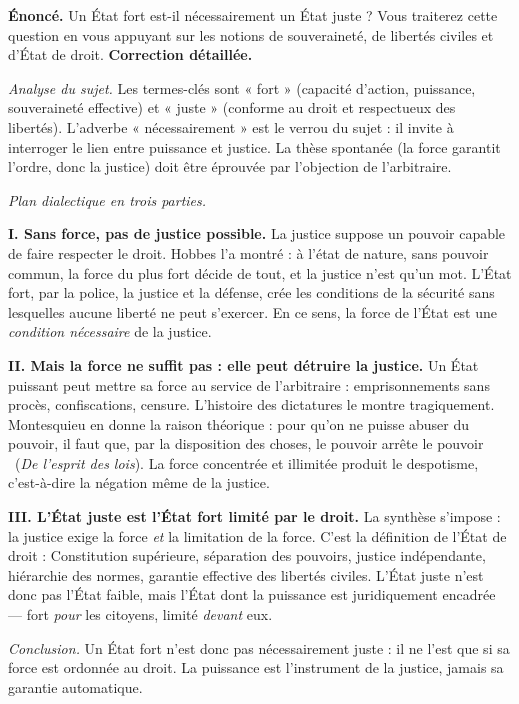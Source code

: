 \documentclass[11pt]{article}
\begin{document}
\begin{exoresolu}
\textbf{Énoncé.} Un État fort est-il nécessairement un État juste ? Vous traiterez cette question en vous appuyant sur les notions de souveraineté, de libertés civiles et d'État de droit.
\tcblower
\textbf{Correction détaillée.}

\emph{Analyse du sujet.} Les termes-clés sont « fort » (capacité d'action, puissance, souveraineté effective) et « juste » (conforme au droit et respectueux des libertés). L'adverbe « nécessairement » est le verrou du sujet : il invite à interroger le lien entre puissance et justice. La thèse spontanée (la force garantit l'ordre, donc la justice) doit être éprouvée par l'objection de l'arbitraire.

\emph{Plan dialectique en trois parties.}

\textbf{I. Sans force, pas de justice possible.} La justice suppose un pouvoir capable de faire respecter le droit. Hobbes l'a montré : à l'état de nature, sans pouvoir commun, la force du plus fort décide de tout, et la justice n'est qu'un mot. L'État fort, par la police, la justice et la défense, crée les conditions de la sécurité sans lesquelles aucune liberté ne peut s'exercer. En ce sens, la force de l'État est une \emph{condition nécessaire} de la justice.

\textbf{II. Mais la force ne suffit pas : elle peut détruire la justice.} Un État puissant peut mettre sa force au service de l'arbitraire : emprisonnements sans procès, confiscations, censure. L'histoire des dictatures le montre tragiquement. Montesquieu en donne la raison théorique : \guillemotleft pour qu'on ne puisse abuser du pouvoir, il faut que, par la disposition des choses, le pouvoir arrête le pouvoir \guillemotright\ (\emph{De l'esprit des lois}). La force concentrée et illimitée produit le despotisme, c'est-à-dire la négation même de la justice.

\textbf{III. L'État juste est l'État fort limité par le droit.} La synthèse s'impose : la justice exige la force \emph{et} la limitation de la force. C'est la définition de l'État de droit : Constitution supérieure, séparation des pouvoirs, justice indépendante, hiérarchie des normes, garantie effective des libertés civiles. L'État juste n'est donc pas l'État faible, mais l'État dont la puissance est juridiquement encadrée — fort \emph{pour} les citoyens, limité \emph{devant} eux.

\emph{Conclusion.} Un État fort n'est donc pas nécessairement juste : il ne l'est que si sa force est ordonnée au droit. La puissance est l'instrument de la justice, jamais sa garantie automatique.
\end{exoresolu}
\end{document}
